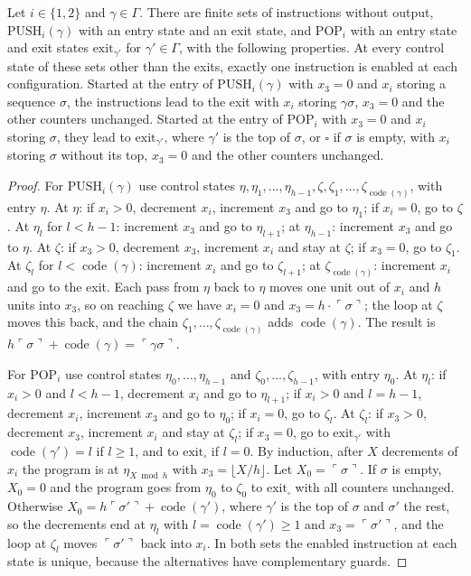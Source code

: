 \documentclass[11pt]{article}
\theoremstyle{plain}
\theoremstyle{definition}
\theoremstyle{remark}
\newcommand{\st}[1]{\ulcorner #1\urcorner}
\newcommand{\code}{\operatorname{code}}
\newcommand{\PUSH}{\mathrm{PUSH}}
\newcommand{\POP}{\mathrm{POP}}
\begin{document}
\begin{lemma}\label{lem:macros}
Let $i\in\{1,2\}$ and $\gamma\in\Gamma$. There are finite sets of instructions without output, $\PUSH_i(\gamma)$ with an entry state and an exit state, and $\POP_i$ with an entry state and exit states $\mathrm{exit}_{\gamma'}$ for $\gamma'\in\Gamma$, with the following properties. At every control state of these sets other than the exits, exactly one instruction is enabled at each configuration. Started at the entry of $\PUSH_i(\gamma)$ with $x_3=0$ and $x_i$ storing a sequence $\sigma$, the instructions lead to the exit with $x_i$ storing $\gamma\sigma$, $x_3=0$ and the other counters unchanged. Started at the entry of $\POP_i$ with $x_3=0$ and $x_i$ storing $\sigma$, they lead to $\mathrm{exit}_{\gamma'}$, where $\gamma'$ is the top of $\sigma$, or $\square$ if $\sigma$ is empty, with $x_i$ storing $\sigma$ without its top, $x_3=0$ and the other counters unchanged.
\end{lemma}

\begin{proof}
For $\PUSH_i(\gamma)$ use control states $\eta,\eta_1,\dots,\eta_{h-1},\zeta,\zeta_1,\dots,\zeta_{\code(\gamma)}$, with entry $\eta$. At $\eta$: if $x_i>0$, decrement $x_i$, increment $x_3$ and go to $\eta_1$; if $x_i=0$, go to $\zeta$. At $\eta_l$ for $l<h-1$: increment $x_3$ and go to $\eta_{l+1}$; at $\eta_{h-1}$: increment $x_3$ and go to $\eta$. At $\zeta$: if $x_3>0$, decrement $x_3$, increment $x_i$ and stay at $\zeta$; if $x_3=0$, go to $\zeta_1$. At $\zeta_l$ for $l<\code(\gamma)$: increment $x_i$ and go to $\zeta_{l+1}$; at $\zeta_{\code(\gamma)}$: increment $x_i$ and go to the exit. Each pass from $\eta$ back to $\eta$ moves one unit out of $x_i$ and $h$ units into $x_3$, so on reaching $\zeta$ we have $x_i=0$ and $x_3=h\cdot\st\sigma$; the loop at $\zeta$ moves this back, and the chain $\zeta_1,\dots,\zeta_{\code(\gamma)}$ adds $\code(\gamma)$. The result is $h\st\sigma+\code(\gamma)=\st{\gamma\sigma}$.

For $\POP_i$ use control states $\eta_0,\dots,\eta_{h-1}$ and $\zeta_0,\dots,\zeta_{h-1}$, with entry $\eta_0$. At $\eta_l$: if $x_i>0$ and $l<h-1$, decrement $x_i$ and go to $\eta_{l+1}$; if $x_i>0$ and $l=h-1$, decrement $x_i$, increment $x_3$ and go to $\eta_0$; if $x_i=0$, go to $\zeta_l$. At $\zeta_l$: if $x_3>0$, decrement $x_3$, increment $x_i$ and stay at $\zeta_l$; if $x_3=0$, go to $\mathrm{exit}_{\gamma'}$ with $\code(\gamma')=l$ if $l\ge1$, and to $\mathrm{exit}_\square$ if $l=0$. By induction, after $X$ decrements of $x_i$ the program is at $\eta_{X\bmod h}$ with $x_3=\lfloor X/h\rfloor$. Let $X_0=\st\sigma$. If $\sigma$ is empty, $X_0=0$ and the program goes from $\eta_0$ to $\zeta_0$ to $\mathrm{exit}_\square$ with all counters unchanged. Otherwise $X_0=h\st{\sigma'}+\code(\gamma')$, where $\gamma'$ is the top of $\sigma$ and $\sigma'$ the rest, so the decrements end at $\eta_l$ with $l=\code(\gamma')\ge1$ and $x_3=\st{\sigma'}$, and the loop at $\zeta_l$ moves $\st{\sigma'}$ back into $x_i$. In both sets the enabled instruction at each state is unique, because the alternatives have complementary guards.
\end{proof}
\end{document}
